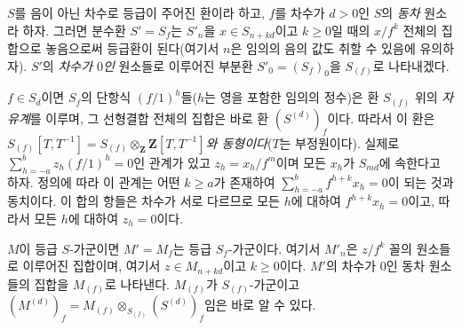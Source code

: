 \begin{env}[2.2.1]
\label{II.2.2.1-ko}
$S$를 음이 아닌 차수로 등급이 주어진 환이라 하고, $f$를 차수가
$d>0$인 $S$의 \emph{동차} 원소라 하자. 그러면 분수환 $S'=S_f$는
$S'_n$을 $x\in S_{n+kd}$이고 $k\geq 0$일 때의 $x/f^k$ 전체의
집합으로 놓음으로써 등급환이 된다(여기서 $n$은 임의의 음의 값도 취할
수 있음에 유의하자). $S'$의 \emph{차수가 $0$인} 원소들로 이루어진
부분환 $S'_0=(S_f)_0$을 $S_{(f)}$로 나타내겠다.

$f\in S_d$이면 $S_f$의 단항식 $(f/1)^h$들($h$는 영을 포함한 임의의
정수)은 환 $S_{(f)}$ 위의 \emph{자유계}를 이루며, 그 선형결합 전체의
집합은 바로
환 $(S^{(d)})_f$이다. 따라서 이 환은
\emph{$S_{(f)}[T,T^{-1}]=S_{(f)}\otimes_{\mathbf{Z}}\mathbf{Z}[T,T^{-1}]$와
동형이다}($T$는 부정원이다). 실제로
$\sum_{h=-a}^{b}z_h(f/1)^h=0$인 관계가 있고 $z_h=x_h/f^m$이며 모든
$x_h$가 $S_{md}$에 속한다고 하자. 정의에 따라 이 관계는
어떤 $k\geq a$가 존재하여
$\sum_{h=-a}^{b}f^{h+k}x_h=0$이 되는 것과 동치이다. 이 합의 항들은
차수가 서로 다르므로 모든 $h$에 대하여 $f^{h+k}x_h=0$이고, 따라서
모든 $h$에 대하여 $z_h=0$이다.

$M$이 등급 $S$-가군이면 $M'=M_f$는 등급 $S_f$-가군이다. 여기서
$M'_n$은 $z/f^k$ 꼴의 원소들로 이루어진 집합이며, 여기서
$z\in M_{n+kd}$이고 $k\geq 0$이다.
$M'$의 차수가 $0$인 동차 원소들의 집합을 $M_{(f)}$로 나타낸다.
$M_{(f)}$가 $S_{(f)}$-가군이고
$(M^{(d)})_f=M_{(f)}\otimes_{S_{(f)}}(S^{(d)})_f$임은 바로 알 수 있다.
\end{env}
